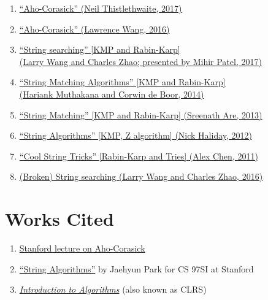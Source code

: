 \documentclass[11pt, oneside]{article}
\begin{document}
\begin{enumerate}
  \item \href{https://activities.tjhsst.edu/sct/lectures/1617/2017-06-02_Aho_Corasick.pdf}{``Aho-Corasick'' (Neil Thistlethwaite, 2017)}
  \item \href{https://activities.tjhsst.edu/sct/lectures/1516/SCT_Aho_Corasick.pdf}{``Aho-Corasick'' (Lawrence Wang, 2016)}
  \item \href{https://activities.tjhsst.edu/sct/lectures/1718/2017-10-27_String_Searching.pdf}{``String searching'' [KMP and Rabin-Karp] \\ (Larry Wang and Charles Zhao; presented by Mihir Patel, 2017)}
  \item \href{https://activities.tjhsst.edu/sct/lectures/1415/stringmatching_10_3_14.pdf}{``String Matching Algorithms'' [KMP and Rabin-Karp] \\ (Hariank Muthakana and Corwin de Boor, 2014)}
  \item \href{https://activities.tjhsst.edu/sct/lectures/1314/string_matching_11_01_13.pdf}{``String Matching'' [KMP and Rabin-Karp] (Sreenath Are, 2013)}
  \item \href{https://activities.tjhsst.edu/sct/lectures/1112/string.pdf}{``String Algorithms'' [KMP, Z algorithm] (Nick Haliday, 2012)}
  \item \href{https://activities.tjhsst.edu/sct/lectures/1112/strings111811.pdf}{``Cool String Tricks'' [Rabin-Karp and Tries] (Alex Chen, 2011)}
  \item \href{https://activities.tjhsst.edu/sct/lectures/1617/2016-11-11_String_Searching.pdf}{(Broken) String searching (Larry Wang and Charles Zhao, 2016)}
\end{enumerate}

\section{Works Cited}

\begin{enumerate}
  \item \href{http://web.stanford.edu/class/archive/cs/cs166/cs166.1166/lectures/02/Small02.pdf}{Stanford lecture on Aho-Corasick}
  \item \href{https://web.stanford.edu/class/cs97si/10-string-algorithms.pdf}{``String Algorithms''} by Jaehyun Park for CS 97SI at Stanford
  \item \href{https://mitpress.mit.edu/books/introduction-algorithms-third-edition}{\textit{Introduction to Algorithms}} (also known as CLRS)
\end{enumerate}
\end{document}
